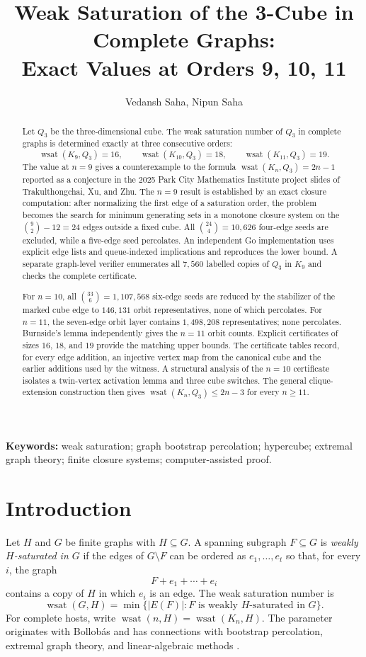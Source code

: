 \documentclass[11pt]{article}
\title{\textbf{Weak Saturation of the 3-Cube in Complete Graphs:\\ Exact Values at Orders 9, 10, 11}}
\author[1]{Vedansh Saha, Nipun Saha}
\affil[1]{Dhirubhai Ambani International School, Mumbai}
\numberwithin{equation}{section}
\newcommand{\wsat}{\operatorname{wsat}}
\begin{document}
\maketitle

\begin{abstract}
Let $Q_3$ be the three-dimensional cube. The weak saturation number of $Q_3$ in complete graphs is determined exactly at three consecutive orders:
\[
\wsat(K_9,Q_3)=16,\qquad
\wsat(K_{10},Q_3)=18,\qquad
\wsat(K_{11},Q_3)=19.
\]
The value at $n=9$ gives a counterexample to the formula $\wsat(K_n,Q_3)=2n-1$ reported as a conjecture in the 2025 Park City Mathematics Institute project slides of Trakulthongchai, Xu, and Zhu. The $n=9$ result is established by an exact closure computation: after normalizing the first edge of a saturation order, the problem becomes the search for minimum generating sets in a monotone closure system on the $\binom92-12=24$ edges outside a fixed cube. All $\binom{24}{4}=10,626$ four-edge seeds are excluded, while a five-edge seed percolates. An independent Go implementation uses explicit edge lists and queue-indexed implications and reproduces the lower bound. A separate graph-level verifier enumerates all $7,560$ labelled copies of $Q_3$ in $K_9$ and checks the complete certificate.

For $n=10$, all $\binom{33}{6}=1,107,568$ six-edge seeds are reduced by the stabilizer of the marked cube edge to $146,131$ orbit representatives, none of which percolates. For $n=11$, the seven-edge orbit layer contains $1,498,208$ representatives; none percolates. Burnside's lemma independently gives the $n=11$ orbit counts. Explicit certificates of sizes $16$, $18$, and $19$ provide the matching upper bounds. The certificate tables record, for every edge addition, an injective vertex map from the canonical cube and the earlier additions used by the witness. A structural analysis of the $n=10$ certificate isolates a twin-vertex activation lemma and three cube switches. The general clique-extension construction then gives $\wsat(K_n,Q_3)\le 2n-3$ for every $n\ge11$.
\end{abstract}

\noindent\textbf{Keywords:} weak saturation; graph bootstrap percolation; hypercube; extremal graph theory; finite closure systems; computer-assisted proof.

\section{Introduction}
Let $H$ and $G$ be finite graphs with $H\subseteq G$. A spanning subgraph $F\subseteq G$ is \emph{weakly $H$-saturated in $G$} if the edges of $G\setminus F$ can be ordered as $e_1,\ldots,e_t$ so that, for every $i$, the graph
\[
F+e_1+\cdots+e_i
\]
contains a copy of $H$ in which $e_i$ is an edge. The weak saturation number is
\[
\wsat(G,H)=\min\{|E(F)|:F\text{ is weakly }H\text{-saturated in }G\}.
\]
For complete hosts, write $\wsat(n,H)=\wsat(K_n,H)$. The parameter originates with Bollob\'as \cite{Bollobas1968} and has connections with bootstrap percolation, extremal graph theory, and linear-algebraic methods \cite{Balogh2012,MNS2017,KMM2021}.
\end{document}

